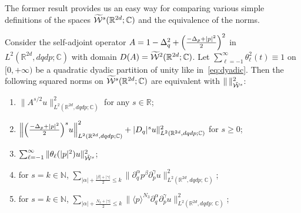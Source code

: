 \documentclass[AHL,Unicode,longabstracts]{cedram}
\newcommand{\C}{\mathbb{C}}
\newcommand{\R}{\mathbb{R}}
\newcommand{\N}{\mathbb{N}}
\newcommand{\clW}{\mathcal{W}}
\newcommand*{\relabel}{\renewcommand{\labelenumi}{(\theenumi)}}
\newcommand*{\romanenumi}{\renewcommand*{\theenumi}{\roman{enumi}}\relabel}
\let\oldtilde\tilde
\renewcommand*{\tilde}[1]{\mathchoice{\widetilde{#1}}{\widetilde{#1}}{\oldtilde{#1}}{\oldtilde{#1}}}
\let\originalleft\left
\let\originalright\right
\renewcommand{\left}{\mathopen{}\mathclose\bgroup\originalleft}
\renewcommand{\right}{\aftergroup\egroup\originalright}
\begin{document}
The former result provides us an easy way for comparing various simple definitions of the spaces $\tilde{\clW}^{s}(\R^{2d};\C)$ and the equivalence of the norms.
\begin{prop}\label{pr:eqnormes}
Consider the self-adjoint operator $A=1-\Delta_{q}^{2}+\left(\frac{-\Delta_{p}+|p|^{2}}{2}\right)^{2}$ in $L^{2}(\R^{2d},dqdp;\C)$ with domain $D(A)=\tilde{\clW}^{2}(\R^{2d};\C)$. Let $\sum_{\ell=-1}^{\infty}\theta_{\ell}^{2}(t)\equiv 1$ on $[0,+\infty)$ be a quadratic dyadic partition of unity like in~\eqref{eq:dyadic}. Then the following squared norms on $\tilde{\clW}^{s}(\R^{2d};\C)$ are equivalent with $\|\,\|^{2}_{\tilde{\clW}^{s}}$:
\begin{enumerate}\romanenumi
\item\label{propE.7.1} $\|A^{s/2}u\|^{2}_{L^{2}(\R^{2d},dqdp;\C)}$ for any $s\in \R$;
\item\label{propE.7.2} $\left\|\left(\frac{-\Delta_p+|p|^2}{2}\right)^s u\right\|^2_{L^{2}(\R^{2d},dqdp;\C)}+|D_q|^s u\|^2_{L^{2}(\R^{2d},dqdp;\C)}$ for $s\geq 0$;
\item\label{propE.7.3} $\sum_{\ell=-1}^{\infty}\|\theta_{\ell}(|p|^{2})u\|^{2}_{\tilde{\clW}^{s}}$;
\item\label{propE.7.4} for $s=k\in \N$, $\sum_{|\alpha|+\frac{|\beta|+|\gamma|}{2}\leq k}\|\partial_{q}^{\alpha}p^{\beta}\partial_{p}^{\gamma}u\|^{2}_{L^{2}(\R^{2d},dqdp;\,\C)}$;
\item\label{propE.7.5} for $s=k\in \N$, $\sum_{|\alpha|+\frac{N_{3}+|\gamma|}{2}\leq k}\|\langle p\rangle^{N_{3}}\partial_{q}^{\alpha}\partial_{p}^{\gamma}u\|^{2}_{L^{2}(\R^{2d},dqdp:\,\C)}$;
\end{enumerate}
\end{prop}
\end{document}
